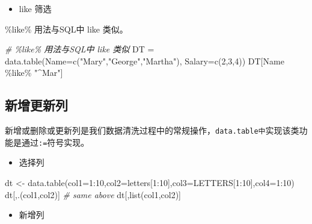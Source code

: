 \documentclass[
]{book}
\newenvironment{Shaded}{\begin{snugshade}}{\end{snugshade}}
\newcommand{\AttributeTok}[1]{\textcolor[rgb]{0.77,0.63,0.00}{#1}}
\newcommand{\CommentTok}[1]{\textcolor[rgb]{0.56,0.35,0.01}{\textit{#1}}}
\newcommand{\DecValTok}[1]{\textcolor[rgb]{0.00,0.00,0.81}{#1}}
\newcommand{\FunctionTok}[1]{\textcolor[rgb]{0.00,0.00,0.00}{#1}}
\newcommand{\NormalTok}[1]{#1}
\newcommand{\OtherTok}[1]{\textcolor[rgb]{0.56,0.35,0.01}{#1}}
\newcommand{\SpecialCharTok}[1]{\textcolor[rgb]{0.00,0.00,0.00}{#1}}
\newcommand{\StringTok}[1]{\textcolor[rgb]{0.31,0.60,0.02}{#1}}
\providecommand{\tightlist}{%
  \setlength{\itemsep}{0pt}\setlength{\parskip}{0pt}}
\begin{document}
\begin{itemize}
\tightlist
\item
  like 筛选
\end{itemize}

\%like\% 用法与SQL中 like 类似。

\begin{Shaded}
\begin{Highlighting}[]
\CommentTok{\# \%like\% 用法与SQL中 like 类似}
\NormalTok{DT }\OtherTok{=} \FunctionTok{data.table}\NormalTok{(}\AttributeTok{Name=}\FunctionTok{c}\NormalTok{(}\StringTok{"Mary"}\NormalTok{,}\StringTok{"George"}\NormalTok{,}\StringTok{"Martha"}\NormalTok{), }\AttributeTok{Salary=}\FunctionTok{c}\NormalTok{(}\DecValTok{2}\NormalTok{,}\DecValTok{3}\NormalTok{,}\DecValTok{4}\NormalTok{))}
\NormalTok{DT[Name }\SpecialCharTok{\%like\%} \StringTok{"\^{}Mar"}\NormalTok{]}
\end{Highlighting}
\end{Shaded}

\hypertarget{ux65b0ux589eux66f4ux65b0ux5217}{%
\subsection{新增更新列}\label{ux65b0ux589eux66f4ux65b0ux5217}}

新增或删除或更新列是我们数据清洗过程中的常规操作，\texttt{data.table中}实现该类功能是通过\texttt{:=}符号实现。

\begin{itemize}
\tightlist
\item
  选择列
\end{itemize}

\begin{Shaded}
\begin{Highlighting}[]
\NormalTok{dt }\OtherTok{\textless{}{-}} \FunctionTok{data.table}\NormalTok{(}\AttributeTok{col1=}\DecValTok{1}\SpecialCharTok{:}\DecValTok{10}\NormalTok{,}\AttributeTok{col2=}\NormalTok{letters[}\DecValTok{1}\SpecialCharTok{:}\DecValTok{10}\NormalTok{],}\AttributeTok{col3=}\NormalTok{LETTERS[}\DecValTok{1}\SpecialCharTok{:}\DecValTok{10}\NormalTok{],}\AttributeTok{col4=}\DecValTok{1}\SpecialCharTok{:}\DecValTok{10}\NormalTok{)}
\NormalTok{dt[,.(col1,col2)]}
\CommentTok{\# same above}
\NormalTok{dt[,}\FunctionTok{list}\NormalTok{(col1,col2)]}
\end{Highlighting}
\end{Shaded}

\begin{itemize}
\tightlist
\item
  新增列
\end{itemize}
\end{document}
